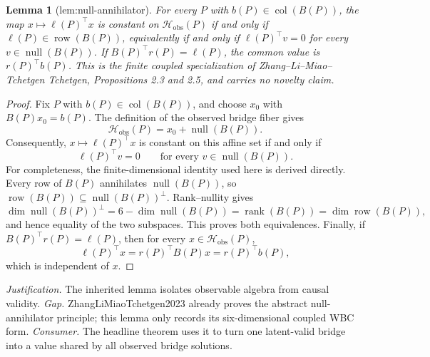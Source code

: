 \documentclass{article}
\newtheorem{lemma}{Lemma}
\begin{document}
\begin{lemma}[lem:null-annihilator]\label{lem:null-annihilator}
For every \(P\) with \(b(P)\in\operatorname{col}(B(P))\), the map \(x\mapsto\ell(P)^{\top}x\) is constant on \(\mathcal H_{\mathrm{obs}}(P)\) if and only if \(\ell(P)\in\operatorname{row}(B(P))\), equivalently if and only if \(\ell(P)^{\top}v=0\) for every \(v\in\operatorname{null}(B(P))\). If \(B(P)^{\top}r(P)=\ell(P)\), the common value is \(r(P)^{\top}b(P)\). This is the finite coupled specialization of Zhang--Li--Miao--Tchetgen Tchetgen, Propositions 2.3 and 2.5, and carries no novelty claim.
\end{lemma}
\begin{proof}
Fix \(P\) with \(b(P)\in\operatorname{col}(B(P))\), and choose
\(x_0\) with \(B(P)x_0=b(P)\).  The definition of the observed bridge fiber gives
\[
 \mathcal H_{\mathrm{obs}}(P)=x_0+\operatorname{null}(B(P)).
\]
Consequently, \(x\mapsto\ell(P)^\top x\) is constant on this affine set if and
only if
\[
 \ell(P)^\top v=0\qquad\text{for every }v\in\operatorname{null}(B(P)).
\]
For completeness, the finite-dimensional identity used here is derived directly.
Every row of \(B(P)\) annihilates \(\operatorname{null}(B(P))\), so
\(\operatorname{row}(B(P))\subseteq\operatorname{null}(B(P))^\perp\).  Rank--nullity
gives
\[
 \dim\operatorname{null}(B(P))^\perp
 =6-\dim\operatorname{null}(B(P))
 =\operatorname{rank}(B(P))
 =\dim\operatorname{row}(B(P)),
\]
and hence equality of the two subspaces.  This proves both equivalences.  Finally,
if \(B(P)^\top r(P)=\ell(P)\), then for every
\(x\in\mathcal H_{\mathrm{obs}}(P)\),
\[
 \ell(P)^\top x=r(P)^\top B(P)x=r(P)^\top b(P),
\]
which is independent of \(x\).
\end{proof}
\par\smallskip\noindent \textit{Justification.} The inherited lemma isolates observable algebra from causal validity. \textit{Gap.} ZhangLiMiaoTchetgen2023 already proves the abstract null-annihilator principle; this lemma only records its six-dimensional coupled WBC form. \textit{Consumer.} The headline theorem uses it to turn one latent-valid bridge into a value shared by all observed bridge solutions.
\end{document}
